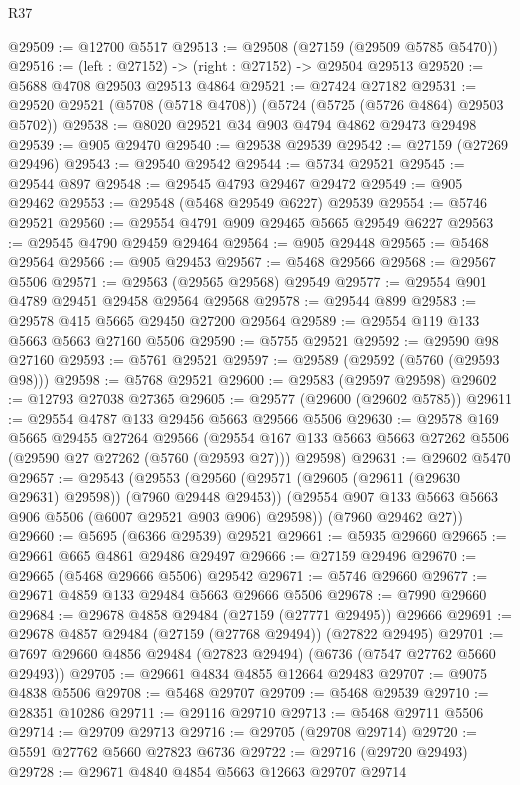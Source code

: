 \begin{lexlean}{R37}
\begin{coremodule}
@29509 := @12700 @5517
@29513 := @29508 (@27159 (@29509 @5785 @5470))
@29516 := (left : @27152) -> (right : @27152) -> @29504 @29513
@29520 := @5688 @4708 @29503 @29513 @4864
@29521 := @27424 @27182
@29531 := @29520 @29521 (@5708 (@5718 @4708)) (@5724 (@5725 (@5726 @4864) @29503 @5702))
@29538 := @8020 @29521 @34 @903 @4794 @4862 @29473 @29498
@29539 := @905 @29470
@29540 := @29538 @29539
@29542 := @27159 (@27269 @29496)
@29543 := @29540 @29542
@29544 := @5734 @29521
@29545 := @29544 @897
@29548 := @29545 @4793 @29467 @29472
@29549 := @905 @29462
@29553 := @29548 (@5468 @29549 @6227) @29539
@29554 := @5746 @29521
@29560 := @29554 @4791 @909 @29465 @5665 @29549 @6227
@29563 := @29545 @4790 @29459 @29464
@29564 := @905 @29448
@29565 := @5468 @29564
@29566 := @905 @29453
@29567 := @5468 @29566
@29568 := @29567 @5506
@29571 := @29563 (@29565 @29568) @29549
@29577 := @29554 @901 @4789 @29451 @29458 @29564 @29568
@29578 := @29544 @899
@29583 := @29578 @415 @5665 @29450 @27200 @29564
@29589 := @29554 @119 @133 @5663 @5663 @27160 @5506
@29590 := @5755 @29521
@29592 := @29590 @98 @27160
@29593 := @5761 @29521
@29597 := @29589 (@29592 (@5760 (@29593 @98)))
@29598 := @5768 @29521
@29600 := @29583 (@29597 @29598)
@29602 := @12793 @27038 @27365
@29605 := @29577 (@29600 (@29602 @5785))
@29611 := @29554 @4787 @133 @29456 @5663 @29566 @5506
@29630 := @29578
    @169
    @5665
    @29455
    @27264
    @29566
    (@29554 @167 @133 @5663 @5663 @27262 @5506 (@29590 @27 @27262 (@5760 (@29593 @27))) @29598)
@29631 := @29602 @5470
@29657 := @29543
    (@29553
      (@29560
        (@29571 (@29605 (@29611 (@29630 @29631) @29598)) (@7960 @29448 @29453))
        (@29554 @907 @133 @5663 @5663 @906 @5506 (@6007 @29521 @903 @906) @29598))
      (@7960 @29462 @27))
@29660 := @5695 (@6366 @29539) @29521
@29661 := @5935 @29660
@29665 := @29661 @665 @4861 @29486 @29497
@29666 := @27159 @29496
@29670 := @29665 (@5468 @29666 @5506) @29542
@29671 := @5746 @29660
@29677 := @29671 @4859 @133 @29484 @5663 @29666 @5506
@29678 := @7990 @29660
@29684 := @29678 @4858 @29484 (@27159 (@27771 @29495)) @29666
@29691 := @29678 @4857 @29484 (@27159 (@27768 @29494)) (@27822 @29495)
@29701 := @7697 @29660 @4856 @29484 (@27823 @29494) (@6736 (@7547 @27762 @5660 @29493))
@29705 := @29661 @4834 @4855 @12664 @29483
@29707 := @9075 @4838 @5506
@29708 := @5468 @29707
@29709 := @5468 @29539
@29710 := @28351 @10286
@29711 := @29116 @29710
@29713 := @5468 @29711 @5506
@29714 := @29709 @29713
@29716 := @29705 (@29708 @29714)
@29720 := @5591 @27762 @5660 @27823 @6736
@29722 := @29716 (@29720 @29493)
@29728 := @29671 @4840 @4854 @5663 @12663 @29707 @29714

\end{coremodule}
\end{lexlean}
